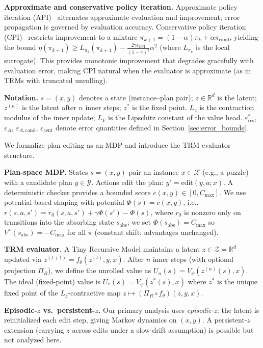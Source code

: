 \documentclass{article}
\theoremstyle{plain}
\theoremstyle{definition}
\theoremstyle{remark}
\newcommand{\shortonly}[1]{#1}
\newcommand{\shortonly}[1]{}
\newcommand{\R}{\mathbb{R}}
\newcommand{\XX}{\mathcal{X}}
\newcommand{\YY}{\mathcal{Y}}
\newcommand{\ZZ}{\mathcal{Z}}
\begin{document}
\shortonly{
\textbf{Approximate and conservative policy iteration.}
Approximate policy iteration (API)~\citep{BertsekasTsitsiklis1996} alternates approximate evaluation and improvement; error propagation is governed by evaluation accuracy.
Conservative policy iteration (CPI)~\citep{KakadeLangford2002} restricts improvement to a mixture $\pi_{k+1} = (1{-}\alpha)\pi_k + \alpha\pi_{\mathrm{cand}}$, yielding the bound $\eta(\pi_{k+1}) \ge L_{\pi_k}(\pi_{k+1}) - \frac{2\gamma\varepsilon_{\mathrm{CPI}}}{(1-\gamma)^2}\alpha^2$ (where $L_{\pi_k}$ is the local surrogate).
This provides monotonic improvement that degrades gracefully with evaluation error, making CPI natural when the evaluator is approximate (as in TRMs with truncated unrolling).

\textbf{Notation.}
$s = (x, y)$ denotes a state (instance--plan pair); $z \in \mathbb{R}^d$ is the latent; $z^{(n)}$ is the latent after $n$ inner steps; $z^*$ is the fixed point. $L_z$ is the contraction modulus of the inner update; $L_V$ is the Lipschitz constant of the value head. $\varepsilon_{\mathrm{res}}^*$, $\varepsilon_A$, $\varepsilon_{A,\mathrm{cand}}$, $\varepsilon_{\mathrm{cent}}$ denote error quantities defined in Section~\ref{sec:error_bounds}.

We formalize plan editing as an MDP and introduce the TRM evaluator structure.

\textbf{Plan-space MDP.}
States $s=(x,y)$ pair an instance $x\in\XX$ (e.g., a puzzle) with a candidate plan $y\in\YY$.
Actions edit the plan: $y'=\mathrm{edit}(y,a;x)$.
A deterministic checker provides a bounded score $c(x,y)\in[0,C_{\max}]$.
We use potential-based shaping with potential $\Phi(s)=c(x,y)$, i.e.,
$r(s,a,s') = r_0(s,a,s') + \gamma \Phi(s') - \Phi(s)$,
where $r_0$ is nonzero only on transitions into the absorbing state $s_{\mathrm{abs}}$; we set $\Phi(s_{\mathrm{abs}})=C_{\max}$ so $V^\pi(s_{\mathrm{abs}})=-C_{\max}$ for all $\pi$ (constant shift; advantages unchanged).

\textbf{TRM evaluator.}
A Tiny Recursive Model maintains a latent $z\in\ZZ=\R^d$ updated via $z^{(t+1)}=f_\theta(z^{(t)},y,x)$.
After $n$ inner steps (with optional projection $\Pi_R$), we define the unrolled value as $U_n(s)=V_\psi(z^{(n)}(s),x)$.
The ideal (fixed-point) value is $U_*(s)=V_\psi(z^*(s),x)$ where $z^*$ is the unique fixed point of the $L_z$-contractive map $z\mapsto (\Pi_R\circ f_\theta)(z,y,x)$.

\textbf{Episodic-$z$ vs.\ persistent-$z$.}
Our primary analysis uses \emph{episodic-$z$}: the latent is reinitialized each edit step, giving Markov dynamics on $(x,y)$.
A persistent-$z$ extension (carrying $z$ across edits under a slow-drift assumption) is possible but not analyzed here.

}
\end{document}
